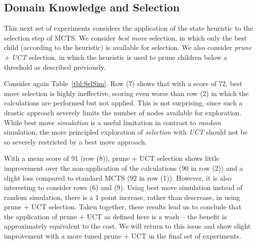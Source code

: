 \documentclass[letterpaper]{article}
\begin{document}
\subsection{Domain Knowledge and Selection}

%

This next set of experiments considers the application of the state heuristic to the selection step of MCTS. We consider {\it best move} selection, in which only the best child (according to the heuristic) is available for selection. We also consider {\it prune + UCT} selection, in which the heuristic is used to prune children below a threshold as described previously.

Consider again Table~\ref{tbl:SelSim}. Row (7) shows that with a score of 72, best move selection is highly ineffective, scoring even worse than row (2) in which the calculations are performed but not applied. This is not surprising, since such a drastic approach severely limits the number of nodes available for exploration. While best move {\it simulation} is a useful limitation in contrast to {\it random} simulation, the more principled exploration of {\it selection} with {\it UCT} should not be so severely restricted by a best move approach.

With a mean score of 91 (row (8)), prune + UCT selection shows little improvement over the non-application of the calculations (90 in row (2)) and a slight loss compared to standard MCTS (92 in row (1)). However, it is also interesting to consider rows (6) and (9). Using best move simulation instead of random simulation, there is a 1 point increase, rather than descrease, in using prune + UCT selection. Taken together, these results lead us to conclude that the application of prune + UCT as defined here is a wash -- the benefit is approximately equivalent to the cost. We will return to this issue and show slight improvement with a more tuned prune + UCT in the final set of experiments.

\end{document}
